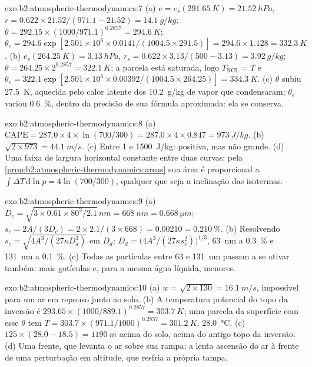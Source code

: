 \begin{solution}{exo:b2:atmospheric-thermodynamics:7}
(a) $e = e_s(\qty{291.65}{K}) = \qty{21.52}{hPa}$, $r = 0.622 \times 21.52/(971.1 - 21.52) =
\qty{14.1}{g/kg}$; $\theta = 292.15 \times (1000/971.1)^{0.2857} = \qty{294.6}{K}$; $\theta_e =
294.6 \exp[2.501 \times 10^6 \times 0.0141/(1004.5 \times 291.5)] = 294.6 \times 1.128 =
\qty{332.3}{K}$. (b) $e_s(\qty{264.25}{K}) = \qty{3.13}{hPa}$, $r_s = 0.622 \times 3.13/(500 -
3.13) = \qty{3.92}{g/kg}$; $\theta = 264.25 \times 2^{0.2857} = \qty{322.1}{K}$; a parcela está
saturada, logo $T_{\text{NCL}} = T$ e $\theta_e = 322.1 \exp[2.501 \times 10^6 \times
0.00392/(1004.5 \times 264.25)] = \qty{334.3}{K}$. (c) $\theta$ subiu \qty{27.5}{K}, aquecida
pelo calor latente dos \qty{10.2}{g/kg} de vapor que condensaram; $\theta_e$ variou
\qty{0.6}{\percent}, dentro da precisão de sua fórmula aproximada: ela se conserva.
\end{solution}

\begin{solution}{exo:b2:atmospheric-thermodynamics:8}
(a) $\text{CAPE} = 287.0 \times 4 \times \ln(700/300) = 287.0 \times 4 \times 0.847 =
\qty{973}{J/kg}$. (b) $\sqrt{2 \times 973} = \qty{44.1}{m/s}$. (c) Entre 1 e
\qty{1500}{J/kg}: positiva, mas não grande. (d) Uma faixa de largura horizontal constante entre duas
curvas; pela \cref{prop:b2:atmospheric-thermodynamics:areas} sua área é proporcional a $\int
\Delta T\,\mathrm{d}\ln p = 4 \ln(700/300)$, qualquer que seja a inclinação das isotermas.
\end{solution}

\begin{solution}{exo:b2:atmospheric-thermodynamics:9}
(a) $D_c = \sqrt{3 \times 0.61 \times 80^3/2.1}\,\unit{nm} = \qty{668}{nm} =
\qty{0.668}{\micro m}$; $s_c = 2A/(3D_c) = 2 \times 2.1/(3 \times 668) = 0.00210 =
\qty{0.210}{\percent}$. (b) Resolvendo $s_c = \sqrt{4A^3/(27\kappa D_d^3)}$ em $D_d$: $D_d =
\bigl(4A^3/(27\kappa s_c^2)\bigr)^{1/3}$, \qty{63}{nm} a \qty{0.3}{\percent} e \qty{131}{nm} a
\qty{0.1}{\percent}. (c) Todas as partículas entre 63 e \qty{131}{nm} passam a se ativar também: mais
gotículas e, para a mesma água líquida, menores.
\end{solution}

\begin{solution}{exo:b2:atmospheric-thermodynamics:10}
(a) $w = \sqrt{2 \times 130} = \qty{16.1}{m/s}$, impossível para um ar em repouso junto ao solo.
(b) A temperatura potencial do topo da inversão é $293.65 \times (1000/889.1)^{0.2857} =
\qty{303.7}{K}$; uma parcela da superfície com esse $\theta$ tem $T = 303.7 \times (971.1/1000)^{0.2857}
= \qty{301.2}{K}$, \qty{28.0}{\celsius}. (c) $125 \times (28.0 - 18.5) = \qty{1190}{m}$ acima do
solo, acima do antigo topo da inversão. (d) Uma frente, que levanta o ar sobre sua rampa; a lenta ascensão
do ar à frente de uma perturbação em altitude, que resfria a própria tampa.
\end{solution}

